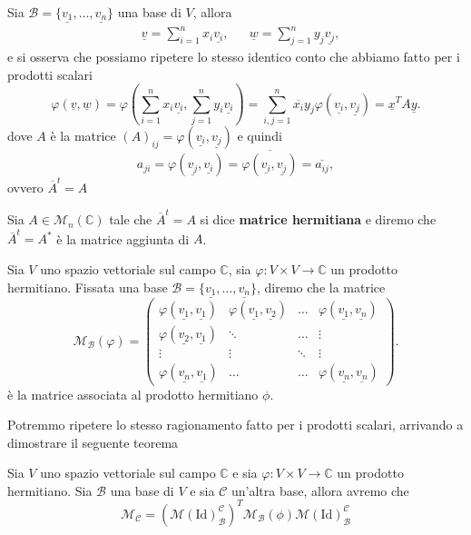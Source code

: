 Sia $\mathcal{B} = \{ \underline{v_1}, \ldots, \underline{v_n} \}$ una base di $V$, allora
\begin{align}
&\underline{v}=\sum_{i=1}^n x_i \underline{v_i}, & &\underline{w}=\sum_{j=1}^n y_j \underline{v_j},
\end{align}
e si osserva che possiamo ripetere lo stesso identico conto che abbiamo fatto per i prodotti scalari
$$
    \varphi(\underline{v}, \underline{w}) = \varphi(\sum_{i=1}^n x_i \underline{v_i}, \sum_{j=1}^n y_i \underline{v_i}) = \sum_{i, j=1}^n \overline{x_i} y_j \varphi(\underline{v_i}, \underline{v_j}) = \underline{x}^T A \underline{y}.
$$
dove $A$ è la matrice $(A)_{ij} = \varphi(\underline{v_i}, \underline{v_j})$ e quindi
$$
    a_{ji} = \varphi(\underline{v_j}, \underline{v_i}) = \overline{\varphi(\underline{v_i}, \underline{v_j})} = \overline{a_{ij}},
$$
ovvero $\overline{A}^t = A$
\begin{definition}
    Sia $A \in \mathcal{M}_n(\mathbb{C})$ tale che $\overline{A}^t = A$ si dice \textbf{matrice hermitiana} e diremo che $\overline{A}^t = A^*$ è la matrice aggiunta di $A$. 
\end{definition}
\begin{definition}
    Sia $V$ uno spazio vettoriale sul campo $\mathbb{C}$, sia $\varphi: V \times V \to \mathbb{C}$ un prodotto hermitiano. Fissata una base $\mathcal{B}=\{ \underline{v_1}, \ldots, \underline{v_n} \}$, diremo che la matrice
    $$
        \mathcal{M}_{\mathcal{B}}(\varphi) = \begin{pmatrix}
            \varphi(\underline{v_1}, \underline{v_1}) & \varphi(\underline{v_1}, \underline{v_2}) & \ldots & \varphi(\underline{v_1}, \underline{v_n}) \\
            \varphi(\underline{v_2}, \underline{v_1}) & \ddots & \ldots & \vdots \\
            \vdots & \vdots & \ddots & \vdots \\
            \varphi(\underline{v_n}, \underline{v_1}) & \ldots & \ldots & \varphi(\underline{v_n}, \underline{v_n})
        \end{pmatrix}.
    $$
    è la matrice associata al prodotto hermitiano $\mathcal{\phi}$.
\end{definition}
Potremmo ripetere lo stesso ragionamento fatto per i prodotti scalari, arrivando a dimostrare il seguente teorema
\begin{theorem}
    Sia $V$ uno spazio vettoriale sul campo $\mathbb{C}$ e sia $\varphi: V \times V \to \mathbb{C}$ un prodotto hermitiano. Sia $\mathcal{B}$ una base di $V$ e sia
    $\mathcal{C}$ un'altra base, allora avremo che
    $$
        \mathcal{M}_{\mathcal{C}} = (\mathcal{M}(\text{Id})^{\mathcal{C}}_\mathcal{B})^T \mathcal{M}_{\mathcal{B}}(\phi) \mathcal{M}(\text{Id})^\mathcal{C}_\mathcal{B}
    $$
\end{theorem}

